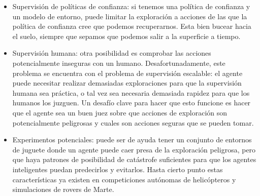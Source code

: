 \documentclass[12pt,a4paper]{article}
\begin{document}
\begin{itemize}
\item Supervisión de políticas de confianza: si tenemos una política de confianza y un modelo de entorno, puede limitar la exploración a acciones de las que la política de confianza cree que podemos recuperarnos. Esta bien bucear hacia el suelo, siempre que sepamos que podemos salir a la superficie a tiempo.

\item Supervisión humana: otra posibilidad es comprobar las acciones potencialmente inseguras con un humano. Desafortunadamente, este problema se encuentra con el problema de supervisión escalable: el agente puede necesitar realizar demasiadas exploraciones para que la supervisión humana sea práctica, o tal vez sea necesaria demasiada rapidez para que los humanos los juzguen. Un desafío clave para hacer que esto funcione es hacer que el agente sea un buen juez sobre que acciones de exploración son potencialmente peligrosas y cuales son acciones seguras que se pueden tomar.

\item Experimentos potenciales: puede ser de ayuda tener un conjunto de entornos de juguete donde un agente  puede caer presa de la exploración peligrosa, pero que haya patrones de posibilidad de catástrofe suficientes para que los agentes inteligentes puedan predecirlos y evitarlos. Hasta cierto punto estas características ya existen en competiciones autónomas de helicópteros y simulaciones de rovers de Marte.
\end{itemize}
\end{document}
